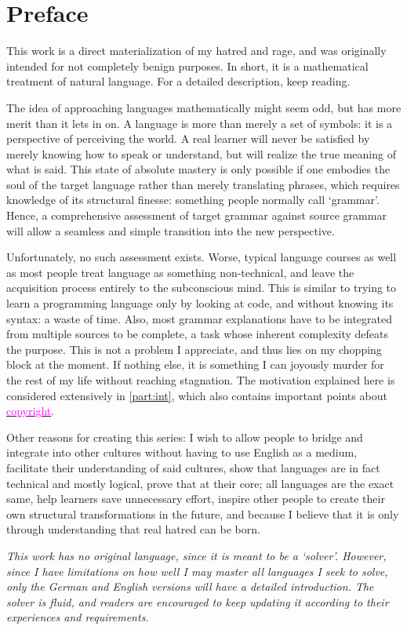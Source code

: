\chapter*{Preface}
This work is a direct materialization of my hatred and rage, and was originally intended for not completely benign purposes. In short, it is a mathematical treatment of natural language. For a detailed description, keep reading.

The idea of approaching languages mathematically might seem odd, but has more merit than it lets in on. A language is more than merely a set of symbols: it is a perspective of perceiving the world. A real learner will never be satisfied by merely knowing how to speak or understand, but will realize the true meaning of what is said. This state of absolute mastery is only possible if one embodies the soul of the target language rather than merely translating phrases, which requires knowledge of its structural finesse: something  people normally call `grammar'. Hence, a comprehensive assessment of target grammar against source grammar will allow a seamless and simple transition into the new perspective.

Unfortunately, no such assessment exists. Worse, typical language courses as well as most people treat language as something non-technical, and leave the acquisition process entirely to the subconscious mind. This is similar to trying to learn a programming language only by looking at code, and without knowing its syntax: a waste of time. Also, most grammar explanations have to be integrated from multiple sources to be complete, a task whose inherent complexity defeats the purpose. This is not a problem I appreciate, and thus lies on my chopping block at the moment. If nothing else, it is something I can joyously murder for the rest of my life without reaching stagnation. The motivation explained here is considered extensively in \autoref{part:int}, which also contains important points about  \hyperref[copyright]{\textcolor{magenta}{copyright}}.

Other reasons for creating this series: I wish to allow people to bridge and integrate into other cultures without having to use English as a medium,  facilitate their understanding of said cultures, show that languages are in fact technical and mostly logical, prove that at their core; all languages are the exact same, help learners save unnecessary effort,  inspire other people to create their own structural transformations in the future, and because I believe that it is only through understanding that real hatred can be born.

\textit{This work has no original language, since it is meant to be a `solver'. However, since I have limitations on how well I may master all languages I seek to solve, only the German and English versions will have a detailed introduction. The solver is fluid, and readers are encouraged to keep updating it according to their experiences and requirements.}